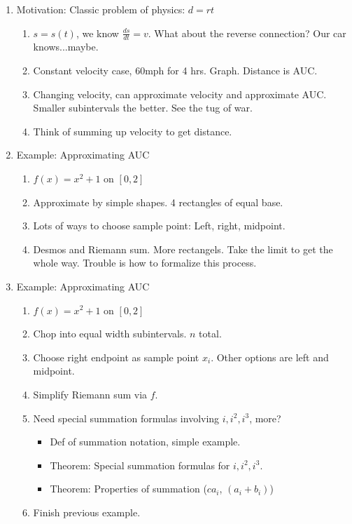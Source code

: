 \documentclass{article}
\begin{document}
\begin{enumerate}

\item Motivation: Classic problem of physics: $d=rt$
\begin{enumerate}
\item $s=s(t)$, we know $\frac{ds}{dt} = v$. What about the reverse connection? Our car knows...maybe.
\item Constant velocity case, 60mph for 4 hrs. Graph. Distance is AUC.
\item Changing velocity, can approximate velocity and approximate AUC. Smaller subintervals the better. See the tug of war.
\item Think of summing up velocity to get distance.
\end{enumerate}

\item Example: Approximating AUC
\begin{enumerate}
\item $f(x)=x^2+1$ on $[0,2]$
\item Approximate by simple shapes. 4 rectangles of equal base.
\item Lots of ways to choose sample point: Left, right, midpoint.
\item Desmos and Riemann sum. More rectangels. Take the limit to get the whole way. Trouble is how to formalize this process.
\end{enumerate} 

\item Example: Approximating AUC
\begin{enumerate}
\item $f(x)=x^2+1$ on $[0,2]$
\item Chop into equal width subintervals. $n$ total.
\item Choose right endpoint as sample point $x_i$. Other options are left and midpoint.
\item Simplify Riemann sum via $f$.
\item Need special summation formulas involving $i, i^2, i^3$, more?
\begin{itemize}
\item Def of summation notation, simple example.
\item Theorem: Special summation formulas for $i, i^2, i^3$.
\item Theorem: Properties of summation ($ca_i$, $(a_i+b_i)$)
\end{itemize}
\item Finish previous example.
\end{enumerate}


\end{enumerate}
\end{document}
